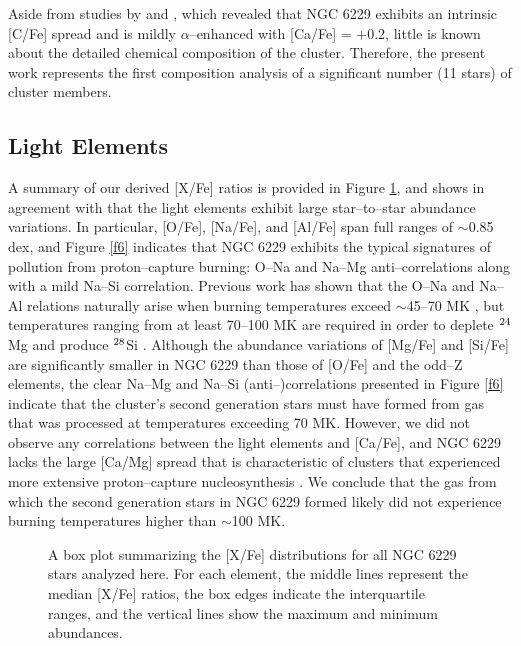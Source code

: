 \documentclass[12pt,preprint]{emulateapj}
\newcommand\iso[2]{$^{\rm #1}$#2}
\begin{document}
Aside from studies by \citet[][high resolution; 1 star]{Pilachowski83} and
\citet[][medium resolution; 3 stars]{Wachter98}, which revealed that NGC 6229
exhibits an intrinsic [C/Fe] spread and is mildly $\alpha$--enhanced with
[Ca/Fe] = $+$0.2, little is known about the detailed chemical composition of
the cluster.  Therefore, the present work represents the first composition
analysis of a significant number (11 stars) of cluster members.

\subsection{Light Elements}

A summary of our derived [X/Fe] ratios is provided in Figure \ref{f5}, and 
shows in agreement with \citet{Wachter98} that the light elements exhibit large
star--to--star abundance variations.  In particular, [O/Fe], [Na/Fe], and
[Al/Fe] span full ranges of $\sim$0.85 dex, and Figure \ref{f6} indicates that
NGC 6229 exhibits the typical signatures of pollution from proton--capture
burning: O--Na and Na--Mg anti--correlations along with a mild Na--Si 
correlation.  Previous work has shown that the O--Na and Na--Al relations 
naturally arise when burning temperatures exceed $\sim$45--70 MK 
\citep[e.g.,][]{Langer97,Prantzos07}, but temperatures ranging from at least
70--100 MK are required in order to deplete \iso{24}{Mg} and produce 
\iso{28}{Si} \citep[e.g.,][]{Ventura11,Ventura13}.  Although the abundance 
variations of [Mg/Fe] and [Si/Fe] are significantly smaller in NGC 6229 than
those of [O/Fe] and the odd--Z elements, the clear Na--Mg and Na--Si 
(anti--)correlations presented in Figure \ref{f6} indicate that the cluster's
second generation stars must have formed from gas that was processed at
temperatures exceeding 70 MK.  However, we did not observe any correlations
between the light elements and [Ca/Fe], and NGC 6229 lacks the large [Ca/Mg]
spread that is characteristic of clusters that experienced more extensive
proton--capture nucleosynthesis \citep[e.g.,][]{Carretta15}.  We conclude that
the gas from which the second generation stars in NGC 6229 formed likely did 
not experience burning temperatures higher than $\sim$100 MK.

\begin{figure}
\caption{A box plot summarizing the [X/Fe] distributions for all NGC 6229 stars
analyzed here.  For each element, the middle lines represent the median [X/Fe]
ratios, the box edges indicate the interquartile ranges, and the vertical
lines show the maximum and minimum abundances.}
\label{f5}
\end{figure}
\end{document}
